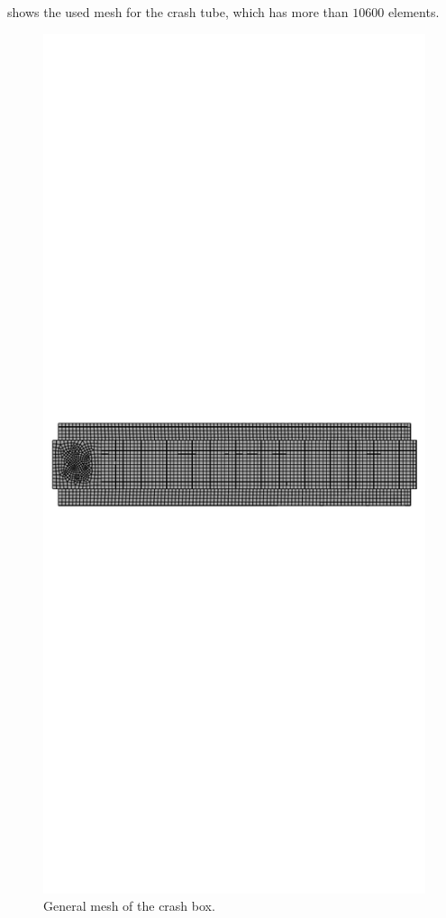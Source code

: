 \documentclass[cmfonts]{witpress}
\begin{document}
 shows the used mesh for the crash tube, which has more than $\num{10600}$ elements.
\begin{figure}[htpb]
	\centering
	\includegraphics[width=0.9\linewidth]{figures/IMG_CUTRES/mesh}
	\caption{General mesh of the crash box.}
	\label{fig:mesh}
\end{figure}
\end{document}
